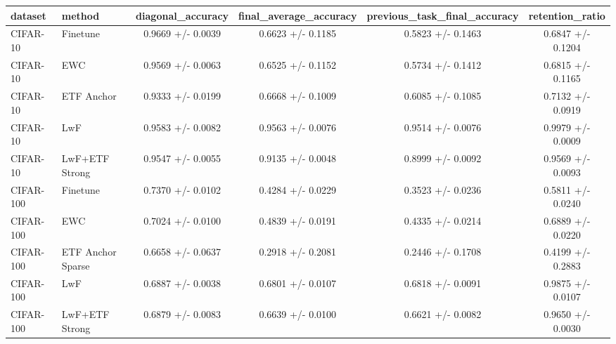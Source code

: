 \begin{tabular}{llcccc}
\hline
dataset & method & diagonal\_accuracy & final\_average\_accuracy & previous\_task\_final\_accuracy & retention\_ratio \\
\hline
CIFAR-10 & Finetune & 0.9669 +/- 0.0039 & 0.6623 +/- 0.1185 & 0.5823 +/- 0.1463 & 0.6847 +/- 0.1204 \\
CIFAR-10 & EWC & 0.9569 +/- 0.0063 & 0.6525 +/- 0.1152 & 0.5734 +/- 0.1412 & 0.6815 +/- 0.1165 \\
CIFAR-10 & ETF Anchor & 0.9333 +/- 0.0199 & 0.6668 +/- 0.1009 & 0.6085 +/- 0.1085 & 0.7132 +/- 0.0919 \\
CIFAR-10 & LwF & 0.9583 +/- 0.0082 & 0.9563 +/- 0.0076 & 0.9514 +/- 0.0076 & 0.9979 +/- 0.0009 \\
CIFAR-10 & LwF+ETF Strong & 0.9547 +/- 0.0055 & 0.9135 +/- 0.0048 & 0.8999 +/- 0.0092 & 0.9569 +/- 0.0093 \\
CIFAR-100 & Finetune & 0.7370 +/- 0.0102 & 0.4284 +/- 0.0229 & 0.3523 +/- 0.0236 & 0.5811 +/- 0.0240 \\
CIFAR-100 & EWC & 0.7024 +/- 0.0100 & 0.4839 +/- 0.0191 & 0.4335 +/- 0.0214 & 0.6889 +/- 0.0220 \\
CIFAR-100 & ETF Anchor Sparse & 0.6658 +/- 0.0637 & 0.2918 +/- 0.2081 & 0.2446 +/- 0.1708 & 0.4199 +/- 0.2883 \\
CIFAR-100 & LwF & 0.6887 +/- 0.0038 & 0.6801 +/- 0.0107 & 0.6818 +/- 0.0091 & 0.9875 +/- 0.0107 \\
CIFAR-100 & LwF+ETF Strong & 0.6879 +/- 0.0083 & 0.6639 +/- 0.0100 & 0.6621 +/- 0.0082 & 0.9650 +/- 0.0030 \\
\hline
\end{tabular}
